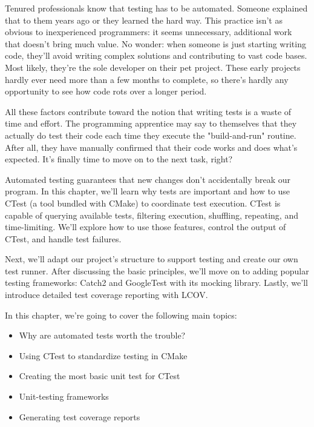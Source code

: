 Tenured professionals know that testing has to be automated. Someone explained that to them years ago or they learned the hard way. This practice isn't as obvious to inexperienced programmers: it seems unnecessary, additional work that doesn't bring much value. No wonder: when someone is just starting writing code, they'll avoid writing complex solutions and contributing to vast code bases. Most likely, they're the sole developer on their pet project. These early projects hardly ever need more than a few months to complete, so there's hardly any opportunity to see how code rots over a longer period.

All these factors contribute toward the notion that writing tests is a waste of time and effort. The programming apprentice may say to themselves that they actually do test their code each time they execute the "build-and-run" routine. After all, they have manually confirmed that their code works and does what's expected. It's finally time to move on to the next task, right?

Automated testing guarantees that new changes don't accidentally break our program. In this chapter, we'll learn why tests are important and how to use CTest (a tool bundled with CMake) to coordinate test execution. CTest is capable of querying available tests, filtering execution, shuffling, repeating, and time-limiting. We'll explore how to use those features, control the output of CTest, and handle test failures.

Next, we'll adapt our project's structure to support testing and create our own test runner.
After discussing the basic principles, we'll move on to adding popular testing frameworks: Catch2 and GoogleTest with its mocking library. Lastly, we'll introduce detailed test coverage reporting with LCOV.

In this chapter, we're going to cover the following main topics:

\begin{itemize}
\item 
Why are automated tests worth the trouble?

\item 
Using CTest to standardize testing in CMake

\item 
Creating the most basic unit test for CTest

\item 
Unit-testing frameworks

\item 
Generating test coverage reports
\end{itemize}






















